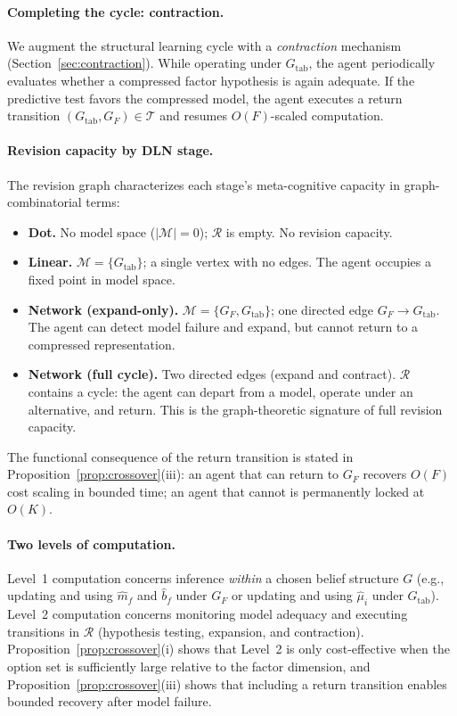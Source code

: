 \paragraph{Completing the cycle: contraction.}
We augment the structural learning cycle with a \emph{contraction} mechanism
(Section~\ref{sec:contraction}).  While operating under $G_{\mathrm{tab}}$, the
agent periodically evaluates whether a compressed factor hypothesis is again
adequate.  If the predictive test favors the compressed model, the agent
executes a return transition $(G_{\mathrm{tab}}, G_F)\in\mathcal{T}$ and resumes
$O(F)$-scaled computation.

\paragraph{Revision capacity by DLN stage.}
The revision graph characterizes each stage's meta-cognitive capacity in
graph-combinatorial terms:
\begin{itemize}[leftmargin=*]
\item \textbf{Dot.}  No model space ($|\mathcal{M}|=0$); $\mathcal{R}$ is empty.
  No revision capacity.
\item \textbf{Linear.}  $\mathcal{M} = \{G_{\mathrm{tab}}\}$; a single vertex
  with no edges.  The agent occupies a fixed point in model space.
\item \textbf{Network (expand-only).}  $\mathcal{M} = \{G_F, G_{\mathrm{tab}}\}$;
  one directed edge $G_F \to G_{\mathrm{tab}}$.  The agent can detect model
  failure and expand, but cannot return to a compressed representation.
\item \textbf{Network (full cycle).}  Two directed edges (expand and contract).
  $\mathcal{R}$ contains a cycle: the agent can depart from a model, operate
  under an alternative, and return.  This is the graph-theoretic signature of
  full revision capacity.
\end{itemize}
The functional consequence of the return transition is stated in
Proposition~\ref{prop:crossover}(iii): an agent that can return to $G_F$ recovers
$O(F)$ cost scaling in bounded time; an agent that cannot is permanently locked
at $O(K)$.

\paragraph{Two levels of computation.}
Level~1 computation concerns inference \emph{within} a chosen belief structure
$G$ (e.g., updating and using $\widehat{m}_f$ and $\widehat{b}_f$ under $G_F$ or
updating and using $\widehat{\mu}_i$ under $G_{\mathrm{tab}}$).
Level~2 computation concerns monitoring model adequacy and executing transitions
in $\mathcal{R}$ (hypothesis testing, expansion, and contraction).
Proposition~\ref{prop:crossover}(i) shows that Level~2 is only cost-effective
when the option set is sufficiently large relative to the factor dimension, and
Proposition~\ref{prop:crossover}(iii) shows that including a return transition
enables bounded recovery after model failure.

